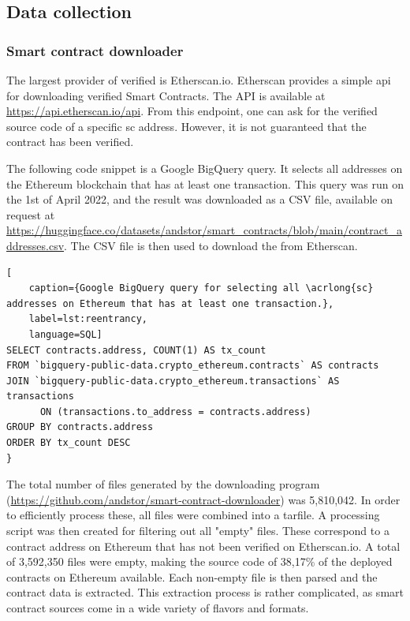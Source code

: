 \subsection{Data collection}
\label{sec:data-collection}

\subsubsection{Smart contract downloader}
\label{sec:smart-contract-downloader}

The largest provider of verified  is Etherscan.io.  Etherscan provides a simple \acrshort{api} for downloading verified Smart Contracts. The API is available at \url{https://api.etherscan.io/api}. From this endpoint, one can ask for the verified source code of a specific \acrshort{sc} address. However, it is not guaranteed that the contract has been verified.

The following code snippet is a Google BigQuery query. It selects all  addresses on the Ethereum blockchain that has at least one transaction. This query was run on the 1st of April 2022, and the result was downloaded as a CSV file, available on request at \url{https://huggingface.co/datasets/andstor/smart_contracts/blob/main/contract_addresses.csv}. The CSV file is then used to download the  from Etherscan.

\begin{lstlisting}[
    caption={Google BigQuery query for selecting all \acrlong{sc} addresses on Ethereum that has at least one transaction.},
    label=lst:reentrancy,
    language=SQL]
SELECT contracts.address, COUNT(1) AS tx_count
FROM `bigquery-public-data.crypto_ethereum.contracts` AS contracts
JOIN `bigquery-public-data.crypto_ethereum.transactions` AS transactions 
      ON (transactions.to_address = contracts.address)
GROUP BY contracts.address
ORDER BY tx_count DESC
}
\end{lstlisting}


The total number of files generated by the downloading program (\url{https://github.com/andstor/smart-contract-downloader}) was 5,810,042. In order to efficiently process these, all files were combined into a tarfile. A processing script was then created for filtering out all "empty" files. These correspond to a contract address on Ethereum that has not been verified on Etherscan.io. A total of 3,592,350 files were empty, making the source code of 38,17\% of the deployed contracts on Ethereum available. Each non-empty file is then parsed and the contract data is extracted. This extraction process is rather complicated, as smart contract sources come in a wide variety of flavors and formats. 

